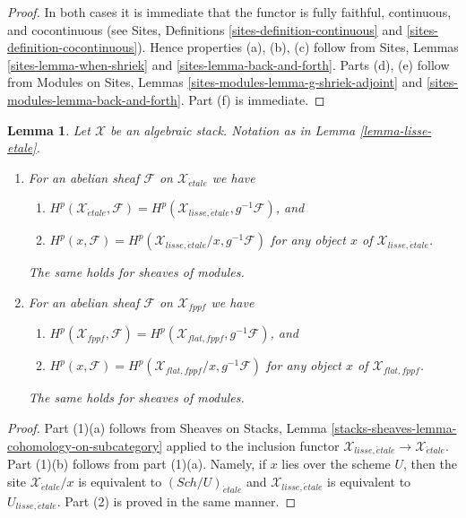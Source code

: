 \documentclass{stacks-project}
\theoremstyle{plain}
\newtheorem{lemma}[subsection]{Lemma}
\theoremstyle{definition}
\theoremstyle{remark}
\numberwithin{equation}{subsection}
\def\Sch{\mathit{Sch}}
\def\etale{{\acute{e}tale}}
\begin{document}
\begin{proof}
In both cases it is immediate that the functor is fully faithful,
continuous, and cocontinuous (see
Sites, Definitions \ref{sites-definition-continuous} and
\ref{sites-definition-cocontinuous}).
Hence properties (a), (b), (c) follow from
Sites, Lemmas \ref{sites-lemma-when-shriek} and
\ref{sites-lemma-back-and-forth}.
Parts (d), (e) follow from
Modules on Sites, Lemmas \ref{sites-modules-lemma-g-shriek-adjoint} and
\ref{sites-modules-lemma-back-and-forth}.
Part (f) is immediate.
\end{proof}

\begin{lemma}
\label{lemma-lisse-etale-cohomology}
Let $\mathcal{X}$ be an algebraic stack. Notation as in
Lemma \ref{lemma-lisse-etale}.
\begin{enumerate}
\item For an abelian sheaf $\mathcal{F}$ on $\mathcal{X}_\etale$ we have
\begin{enumerate}
\item $H^p(\mathcal{X}_\etale, \mathcal{F}) =
H^p(\mathcal{X}_{lisse,\etale}, g^{-1}\mathcal{F})$, and
\item $H^p(x, \mathcal{F}) =
H^p(\mathcal{X}_{lisse,\etale}/x, g^{-1}\mathcal{F})$
for any object $x$ of $\mathcal{X}_{lisse,\etale}$.
\end{enumerate}
The same holds for sheaves of modules.
\item For an abelian sheaf $\mathcal{F}$ on $\mathcal{X}_{fppf}$ we have
\begin{enumerate}
\item $H^p(\mathcal{X}_{fppf}, \mathcal{F}) =
H^p(\mathcal{X}_{flat,fppf}, g^{-1}\mathcal{F})$, and
\item $H^p(x, \mathcal{F}) =
H^p(\mathcal{X}_{flat,fppf}/x, g^{-1}\mathcal{F})$
for any object $x$ of $\mathcal{X}_{flat,fppf}$.
\end{enumerate}
The same holds for sheaves of modules.
\end{enumerate}
\end{lemma}

\begin{proof}
Part (1)(a) follows from Sheaves on Stacks, Lemma
\ref{stacks-sheaves-lemma-cohomology-on-subcategory} applied to the inclusion
functor $\mathcal{X}_{lisse,\etale} \to \mathcal{X}_\etale$.
Part (1)(b) follows from part (1)(a). Namely, if $x$ lies over the
scheme $U$, then the site $\mathcal{X}_\etale/x$ is equivalent
to $(\Sch/U)_\etale$ and $\mathcal{X}_{lisse,\etale}$ is equivalent
to $U_{lisse,\etale}$. Part (2) is proved in the same manner.
\end{proof}
\end{document}

